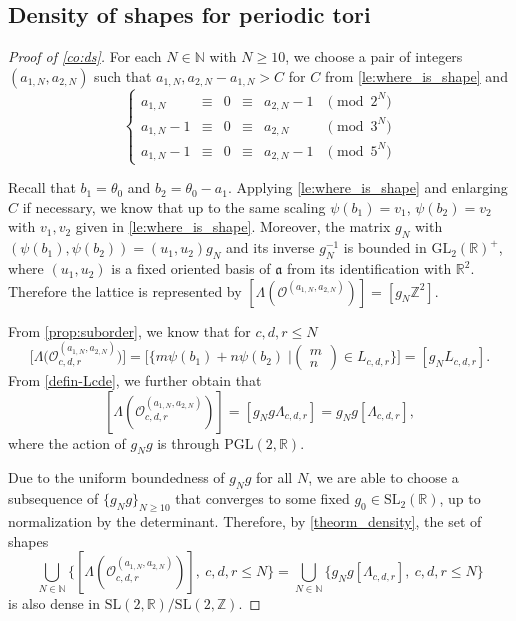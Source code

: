 \documentclass[11pt,letterpaper]{amsart}
\theoremstyle{definition}
\theoremstyle{remark}
\renewcommand{\rm}[1]{\mathrm{#1}}
\newcommand{\cal}[1]{\mathcal{#1}}
\newcommand{\bb}[1]{\mathbb{#1}}
\renewcommand{\frak}[1]{\mathfrak{#1}}
\newcommand{\R}{\bb R}
\newcommand{\Z}{\bb Z}
\newcommand{\N}{\bb N}
\newcommand{\calO}{\cal O}
\newcommand{\SL}{\rm{SL}}
\newcommand{\GL}{\rm{GL}}
\begin{document}
\subsection{Density of shapes for periodic tori}
\label{ss:proof_of_density}

\begin{proof}[Proof of \cref{co:ds}]
For each $N\in\N$ with $N\geq 10$, we choose a pair of integers $(a_{1,N},a_{2,N})$ such that $a_{1,N},a_{2,N}-a_{1,N}>C$ for $C$ from \cref{le:where_is_shape} and 
		$$\left\lbrace \begin{array}{ cccccl}
			a_{1,N} &\equiv&0&\equiv& a_{2,N}-1 &\pmod{ 2^N}\\
			a_{1,N}-1 &\equiv&0&\equiv& a_{2,N} &\pmod{ 3^N}\\
			a_{1,N}-1 &\equiv&0&\equiv& a_{2,N}-1 &\pmod{ 5^N}
		\end{array} \right.$$

Recall that $b_1=\theta_0$ and $b_2=\theta_0-a_1$. Applying \cref{le:where_is_shape} and enlarging $C$ if necessary, we know that up to the same scaling $\psi(b_1)=v_1$, $\psi(b_2)=v_2$ with $v_1,v_2$ given in \cref{le:where_is_shape}. Moreover, the matrix $g_N$ with $(\psi(b_1),\psi(b_2))=(u_1,u_2)g_N$ and its inverse $g_N^{-1}$ is bounded in $\GL_2(\R)^+$, where $(u_1,u_2)$ is a fixed oriented basis of $\frak a$ from its identification with $\R^2$. Therefore the lattice is represented by $[\Lambda(\calO^{(a_{1,N},a_{2,N})})]=[g_N\Z^2]$.

From \cref{prop:suborder}, we know that for $c,d,r\leq N$
\[ \bigg[\Lambda\Big(\calO^{(a_{1,N},a_{2,N})}_{c,d,r}\Big)\bigg]=\bigg[\Big\{m\psi(b_1)+n\psi(b_2)\; \Big\vert \begin{pmatrix}
    m \\ n
\end{pmatrix}\in L_{c,d,r} \Big\}\bigg]=[g_NL_{c,d,r}]. \]
From \cref{defin-Lcde}, we further obtain that
\[[\Lambda(\calO^{(a_{1,N},a_{2,N})}_{c,d,r})]=[g_Ng\Lambda_{c,d,r}]=g_Ng[\Lambda_{c,d,r}] , \]
 where the action of $g_Ng$ is through $\mathrm{PGL(2,\R)}$.

Due to the uniform boundedness of $g_Ng$ for all $N$, we are able to choose a subsequence of $\{g_N g \}_{N \geq 10}$ that converges to some fixed $g_0\in \SL_2(\R)$, up to normalization by the determinant. Therefore, by \cref{theorm_density}, the set of shapes
\[ \bigcup_{N\in\N}\{[\Lambda(\calO^{(a_{1,N},a_{2,N})}_{c,d,r})],\ c,d,r\leq N \}%
=\bigcup _{N\in\N}\{g_Ng[\Lambda_{c,d,r}],\  c,d,r\leq N \}  \]
is also dense in $\SL(2,\R)/\SL(2,\Z)$. 
%
\end{proof}
\end{document}
